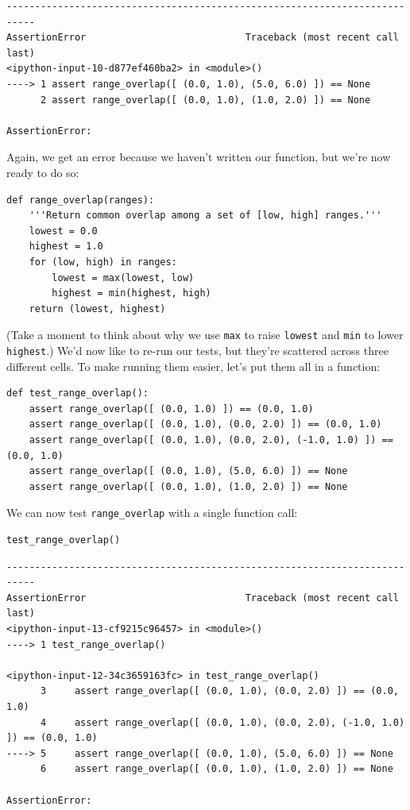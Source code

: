\documentclass[]{book}
\begin{document}
\begin{verbatim}
---------------------------------------------------------------------------
AssertionError                            Traceback (most recent call last)
<ipython-input-10-d877ef460ba2> in <module>()
----> 1 assert range_overlap([ (0.0, 1.0), (5.0, 6.0) ]) == None
      2 assert range_overlap([ (0.0, 1.0), (1.0, 2.0) ]) == None

AssertionError: 
\end{verbatim}

Again, we get an error because we haven't written our function, but
we're now ready to do so:

\begin{verbatim}
def range_overlap(ranges):
    '''Return common overlap among a set of [low, high] ranges.'''
    lowest = 0.0
    highest = 1.0
    for (low, high) in ranges:
        lowest = max(lowest, low)
        highest = min(highest, high)
    return (lowest, highest)
\end{verbatim}

(Take a moment to think about why we use \texttt{max} to raise
\texttt{lowest} and \texttt{min} to lower \texttt{highest}.) We'd now
like to re-run our tests, but they're scattered across three different
cells. To make running them easier, let's put them all in a function:

\begin{verbatim}
def test_range_overlap():
    assert range_overlap([ (0.0, 1.0) ]) == (0.0, 1.0)
    assert range_overlap([ (0.0, 1.0), (0.0, 2.0) ]) == (0.0, 1.0)
    assert range_overlap([ (0.0, 1.0), (0.0, 2.0), (-1.0, 1.0) ]) == (0.0, 1.0)
    assert range_overlap([ (0.0, 1.0), (5.0, 6.0) ]) == None
    assert range_overlap([ (0.0, 1.0), (1.0, 2.0) ]) == None
\end{verbatim}

We can now test \texttt{range\_overlap} with a single function call:

\begin{verbatim}
test_range_overlap()
\end{verbatim}

\begin{verbatim}
---------------------------------------------------------------------------
AssertionError                            Traceback (most recent call last)
<ipython-input-13-cf9215c96457> in <module>()
----> 1 test_range_overlap()

<ipython-input-12-34c3659163fc> in test_range_overlap()
      3     assert range_overlap([ (0.0, 1.0), (0.0, 2.0) ]) == (0.0, 1.0)
      4     assert range_overlap([ (0.0, 1.0), (0.0, 2.0), (-1.0, 1.0) ]) == (0.0, 1.0)
----> 5     assert range_overlap([ (0.0, 1.0), (5.0, 6.0) ]) == None
      6     assert range_overlap([ (0.0, 1.0), (1.0, 2.0) ]) == None

AssertionError: 
\end{verbatim}
\end{document}
